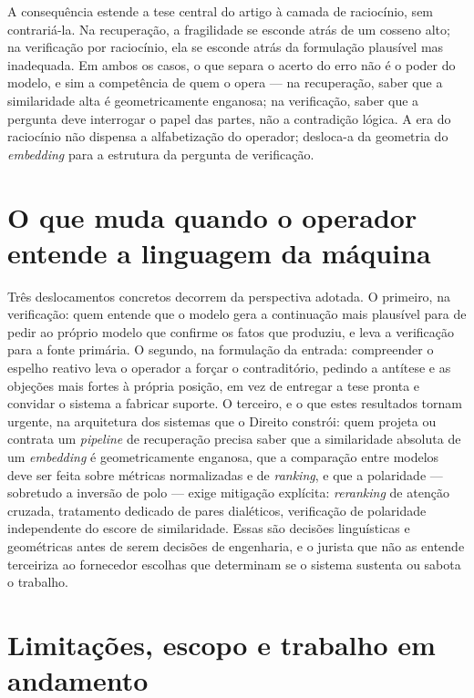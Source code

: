 \documentclass[11pt]{article}
\begin{document}
A consequência estende a tese central do artigo à camada de raciocínio, sem
contrariá-la. Na recuperação, a fragilidade se esconde atrás de um cosseno alto; na
verificação por raciocínio, ela se esconde atrás da formulação plausível mas
inadequada. Em ambos os casos, o que separa o acerto do erro não é o poder do
modelo, e sim a competência de quem o opera --- na recuperação, saber que a
similaridade alta é geometricamente enganosa; na verificação, saber que a pergunta
deve interrogar o papel das partes, não a contradição lógica. A era do raciocínio
não dispensa a alfabetização do operador; desloca-a da geometria do
\textit{embedding} para a estrutura da pergunta de verificação.

\section{O que muda quando o operador entende a linguagem da máquina}

Três deslocamentos concretos decorrem da perspectiva adotada. O primeiro, na
verificação: quem entende que o modelo gera a continuação mais plausível para de
pedir ao próprio modelo que confirme os fatos que produziu, e leva a verificação
para a fonte primária. O segundo, na formulação da entrada: compreender o espelho
reativo leva o operador a forçar o contraditório, pedindo a antítese e as objeções
mais fortes à própria posição, em vez de entregar a tese pronta e convidar o
sistema a fabricar suporte. O terceiro, e o que estes resultados tornam urgente,
na arquitetura dos sistemas que o Direito constrói: quem projeta ou contrata um
\textit{pipeline} de recuperação precisa saber que a similaridade absoluta de um
\textit{embedding} é geometricamente enganosa, que a comparação entre modelos deve
ser feita sobre métricas normalizadas e de \textit{ranking}, e que a polaridade ---
sobretudo a inversão de polo --- exige mitigação explícita: \textit{reranking} de
atenção cruzada, tratamento dedicado de pares dialéticos, verificação de
polaridade independente do escore de similaridade. Essas são decisões linguísticas
e geométricas antes de serem decisões de engenharia, e o jurista que não as
entende terceiriza ao fornecedor escolhas que determinam se o sistema sustenta ou
sabota o trabalho.

\section{Limitações, escopo e trabalho em andamento}
\label{sec:limita}
\end{document}
